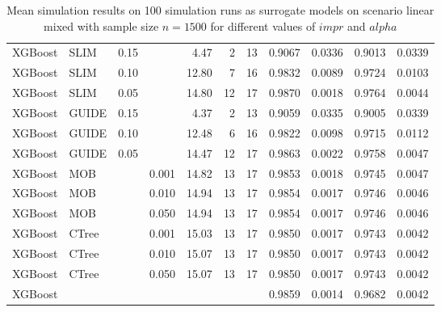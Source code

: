 \begin{table}[!htb]
\begin{tabular}[t]{l|l|r|r|r|r|r|r|r|r|r}
XGBoost & SLIM & 0.15 & & 4.47 & 2 & 13 & 0.9067 & 0.0336 & 0.9013 & 0.0339\\
XGBoost & SLIM & 0.10 & & 12.80 & 7 & 16 & 0.9832 & 0.0089 & 0.9724 & 0.0103\\
XGBoost & SLIM & 0.05 & & 14.80 & 12 & 17 & 0.9870 & 0.0018 & 0.9764 & 0.0044\\
XGBoost & GUIDE & 0.15 & & 4.37 & 2 & 13 & 0.9059 & 0.0335 & 0.9005 & 0.0339\\
XGBoost & GUIDE & 0.10 & & 12.48 & 6 & 16 & 0.9822 & 0.0098 & 0.9715 & 0.0112\\
XGBoost & GUIDE & 0.05 & & 14.47 & 12 & 17 & 0.9863 & 0.0022 & 0.9758 & 0.0047\\
XGBoost & MOB & & 0.001 & 14.82 & 13 & 17 & 0.9853 & 0.0018 & 0.9745 & 0.0047\\
XGBoost & MOB & & 0.010 & 14.94 & 13 & 17 & 0.9854 & 0.0017 & 0.9746 & 0.0046\\
XGBoost & MOB & & 0.050 & 14.94 & 13 & 17 & 0.9854 & 0.0017 & 0.9746 & 0.0046\\
XGBoost & CTree & & 0.001 & 15.03 & 13 & 17 & 0.9850 & 0.0017 & 0.9743 & 0.0042\\
XGBoost & CTree & & 0.010 & 15.07 & 13 & 17 & 0.9850 & 0.0017 & 0.9743 & 0.0042\\
XGBoost & CTree & & 0.050 & 15.07 & 13 & 17 & 0.9850 & 0.0017 & 0.9743 & 0.0042\\
\hline
XGBoost & & & & & & & 0.9859 & 0.0014 & 0.9682 & 0.0042\\
\hline
\end{tabular}
\caption{Mean simulation results on 100 simulation runs as surrogate models on scenario linear mixed with sample size $n=1500$ for different values of $impr$ and $alpha$}
\label{tab:app_linear_mixed_1000}

\end{table}





